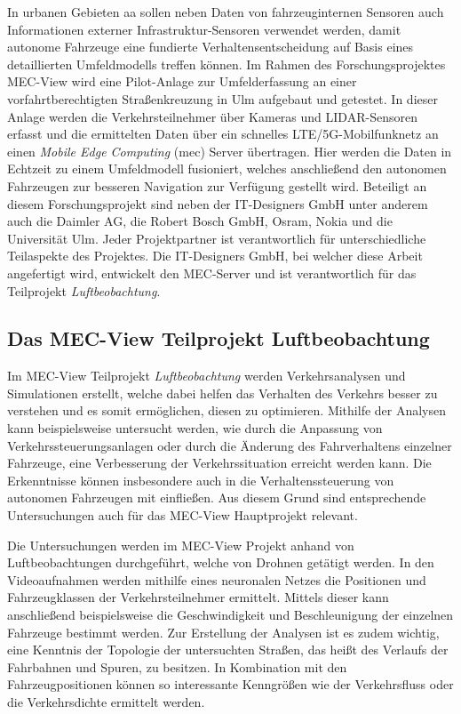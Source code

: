 In urbanen Gebieten aa
sollen neben Daten von fahrzeuginternen Sensoren auch Informationen externer Infrastruktur-Sensoren verwendet werden,
damit autonome Fahrzeuge eine fundierte Verhaltensentscheidung auf Basis eines detaillierten Umfeldmodells treffen können.
Im Rahmen des Forschungsprojektes MEC-View wird eine Pilot-Anlage zur Umfelderfassung an einer vorfahrtberechtigten Straßenkreuzung
in Ulm aufgebaut und getestet. In dieser Anlage werden die Verkehrsteilnehmer über Kameras und LIDAR-Sensoren erfasst
und die ermittelten Daten über ein schnelles LTE/5G-Mobilfunknetz an einen \textit{Mobile Edge Computing} (\acrshort*{mec}) Server übertragen.
Hier werden die Daten in Echtzeit zu einem Umfeldmodell fusioniert, welches anschließend den autonomen Fahrzeugen
zur besseren Navigation zur Verfügung gestellt wird. Beteiligt an diesem Forschungsprojekt sind neben
der IT-Designers GmbH unter anderem auch die Daimler AG, die Robert Bosch GmbH, Osram, Nokia und die Universität Ulm.
Jeder Projektpartner ist verantwortlich für unterschiedliche Teilaspekte des Projektes. Die IT-Designers GmbH,
bei welcher diese Arbeit angefertigt wird, entwickelt den MEC-Server und ist verantwortlich für das
Teilprojekt \textit{Luftbeobachtung}. \cite[]{mecViewWeb}

\subsection{Das MEC-View Teilprojekt Luftbeobachtung}
\label{sec:mecview_sim}

Im MEC-View Teilprojekt \textit{Luftbeobachtung} werden Verkehrsanalysen und Simulationen erstellt, welche dabei helfen
das Verhalten des Verkehrs besser zu verstehen und es somit ermöglichen, diesen zu optimieren.
Mithilfe der Analysen kann beispielsweise untersucht werden, wie durch die Anpassung von Verkehrssteuerungsanlagen
oder durch die Änderung des Fahrverhaltens einzelner Fahrzeuge, eine Verbesserung der Verkehrssituation erreicht werden kann.
Die Erkenntnisse können insbesondere auch in die Verhaltenssteuerung von autonomen Fahrzeugen mit einfließen.
Aus diesem Grund sind entsprechende Untersuchungen auch für das MEC-View Hauptprojekt relevant.

Die Untersuchungen werden im MEC-View Projekt anhand von Luftbeobachtungen durchgeführt, welche von Drohnen getätigt werden.
In den Videoaufnahmen werden mithilfe eines neuronalen Netzes die Positionen und Fahrzeugklassen der Verkehrsteilnehmer ermittelt.
Mittels dieser kann anschließend beispielsweise die Geschwindigkeit und Beschleunigung der einzelnen Fahrzeuge bestimmt werden.
Zur Erstellung der Analysen ist es zudem wichtig, eine Kenntnis der Topologie der untersuchten Straßen, das heißt des
Verlaufs der Fahrbahnen und Spuren, zu besitzen. In Kombination mit den Fahrzeugpositionen können so interessante
Kenngrößen wie der Verkehrsfluss oder die Verkehrsdichte ermittelt werden.

